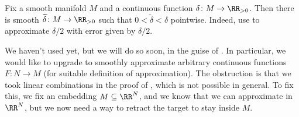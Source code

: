 \documentclass[../notes.tex]{subfiles}
\begin{document}
\begin{example} \label{ex:get-smooth-error}
	Fix a smooth manifold $M$ and a continuous function $\delta\colon M\to\RR_{>0}$. Then there is smooth $\widetilde\delta\colon M\to\RR_{>0}$ such that $0<\widetilde\delta<\delta$ pointwise. Indeed, use  to approximate $\delta/2$ with error given by $\delta/2$.
\end{example}
We haven't used  yet, but we will do so soon, in the guise of . In particular, we would like to upgrade  to smoothly approximate arbitrary continuous functions $F\colon N\to M$ (for suitable definition of approximation). The obstruction is that we took linear combinations in the proof of , which is not possible in general. To fix this, we fix an embedding $M\subseteq\RR^N$, and we know that we can approximate in $\RR^N$, but we now need a way to retract the target to stay inside $M$.
\end{document}
